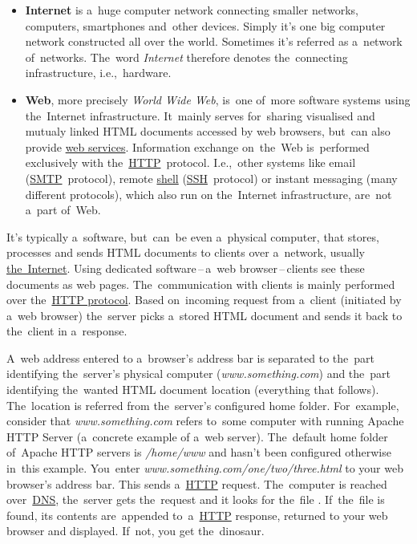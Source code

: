 \label{internetweb}
\begin{itemize}
    \item \textbf{Internet} is a~huge computer network connecting smaller networks, computers, smartphones and~other devices.
          Simply it's one big computer network constructed all over the world.
          Sometimes it's referred as a~network of~networks.
          The~word \textit{Internet} therefore denotes the~connecting infrastructure, i.e.,~hardware.
    \item \textbf{Web}, more precisely \textit{World Wide Web}, is~one of~more software systems using the~Internet infrastructure.
          It~mainly serves for~sharing visualised and mutualy linked HTML documents accessed by web browsers, but~can also provide \hyperref[webserviceapplication]{web services}.
          Information exchange on~the~Web is~performed exclusively with the~\hyperref[http]{HTTP}~protocol.
          I.e.,~other systems like email (\hyperref[smtp]{SMTP}~protocol), remote \hyperref[shellcligui]{shell} (\hyperref[ssh]{SSH}~protocol) or instant messaging (many different protocols), which also run on the~Internet infrastructure, are~not a~part of~Web.
\end{itemize}

\label{namespaces}

\label{webserver}
It's typically a~software, but~can~be even a~physical computer, that stores, processes and sends HTML documents to clients over a~network, usually \hyperref[internetweb]{the~Internet}.
Using dedicated software\,--\,a~web browser\,--\,clients see these documents as web pages.
The~communication with clients is mainly performed over the~\hyperref[http]{HTTP protocol}.
Based on~incoming request from a~client (initiated by a~web browser) the~server picks a~stored HTML document and sends it back to the~client in a~response.

A~web address entered to a~browser's address bar is separated to the~part identifying the~server's physical computer (\textit{www.something.com}) and the~part identifying the~wanted HTML document location (everything that follows).
The~location is referred from the~server's configured home folder.
For~example, consider that \textit{www.something.com} refers to~some computer with running Apache HTTP Server (a~concrete example of a~web server).
The~default home folder of~Apache HTTP servers is \textit{/home/www} and hasn't been configured otherwise in~this example.
You~enter \textit{www.something.com/one/two/three.html} to your web browser's address bar.
This sends a~\hyperref[http]{HTTP} request.
The~computer is reached over~\hyperref[dns]{DNS}, the~server gets the~request and it looks for the~file .
If~the~file is found, its contents are~appended to~a~\hyperref[http]{HTTP} response, returned to your web browser and displayed.
If~not, you get the~dinosaur.

